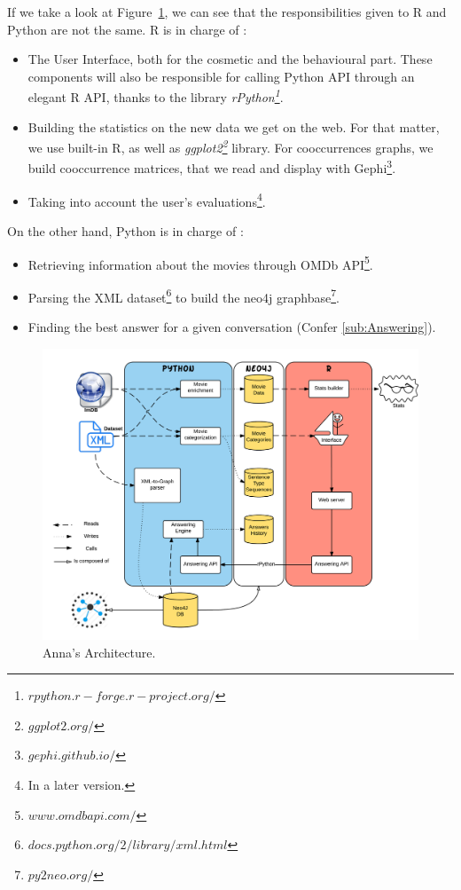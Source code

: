 If we take a look at Figure~\ref{fig:Archi}, we can see that the responsibilities given to R and Python are not the same.
R is in charge of :
\begin{itemize}
    \item The User Interface, both for the cosmetic and the behavioural part.
    These components will also be responsible for calling Python API through an elegant R API, thanks to the library \textit{rPython\footnote{$rpython.r-forge.r-project.org/$}}.
    \item Building the statistics on the new data we get on the web.
    For that matter, we use built-in R, as well as \textit{ggplot2\footnote{$ggplot2.org/$}} library.
    For cooccurrences graphs, we build cooccurrence matrices, that we read and display with Gephi\footnote{$gephi.github.io/$}.
    \item Taking into account the user's evaluations\footnote{In a later version.}.
\end{itemize}

On the other hand, Python is in charge of :
\begin{itemize}
    \item Retrieving information about the movies through OMDb API\footnote{$www.omdbapi.com/$}.
    \item Parsing the XML dataset\footnote{$docs.python.org/2/library/xml.html$} to build the neo4j graphbase\footnote{$py2neo.org/$}.
    \item Finding the best answer for a given conversation (Confer \ref{sub:Answering}).
\end{itemize}

\begin{figure}[!h]
\begin{center}
\includegraphics[width=1.1\textwidth]{./img/Archi.png}
\end{center}
\caption{Anna's Architecture.}
\label{fig:Archi}
\end{figure}
%
